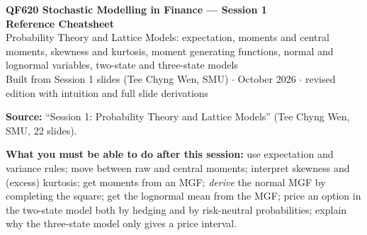 \documentclass[10pt]{article}
\begin{document}
\begin{center}
{\LARGE\bfseries QF620 Stochastic Modelling in Finance --- Session 1\\[2pt] Reference Cheatsheet}\\[6pt]
{\large Probability Theory and Lattice Models: expectation, moments and central moments, skewness and kurtosis, moment generating functions, normal and lognormal variables, two-state and three-state models}\\[4pt]
{\small Built from Session 1 slides (Tee Chyng Wen, SMU) $\cdot$ October 2026 $\cdot$ revised edition with intuition and full slide derivations}
\end{center}
\tableofcontents
\vspace{4pt}
\textbf{Source:} ``Session 1: Probability Theory and Lattice Models'' (Tee Chyng Wen, SMU, 22 slides).

\legend

\textbf{What you must be able to do after this session:} use expectation and variance rules; move between raw and central moments; interpret skewness and (excess) kurtosis; get moments from an MGF; \emph{derive} the normal MGF by completing the square; get the lognormal mean from the MGF; price an option in the two-state model both by hedging and by risk-neutral probabilities; explain why the three-state model only gives a price interval.
\end{document}
